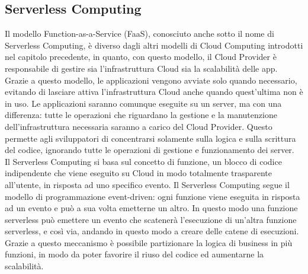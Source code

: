 \subsection{Serverless Computing} \label{serverless}
Il modello Function-as-a-Service (FaaS), conosciuto anche sotto il nome di Serverless Computing, è diverso dagli altri modelli di Cloud Computing introdotti nel capitolo precedente, in quanto, con questo modello, il Cloud Provider è responsabile di gestire sia l'infrastruttura Cloud sia la scalabilità delle app. Grazie a questo modello, le applicazioni vengono avviate solo quando necessario, evitando di lasciare attiva l'infrastruttura Cloud anche quando quest'ultima non è in uso. Le applicazioni saranno comunque eseguite su un server, ma con una differenza: tutte le operazioni che riguardano la gestione e la manutenzione dell'infrastruttura necessaria saranno a carico del Cloud Provider. Questo permette agli sviluppatori di concentrarsi solamente sulla logica e sulla scrittura del codice, ignorando tutte le operazioni di gestione e funzionamento dei server. \\
Il Serverless Computing si basa sul concetto di funzione, un blocco di codice indipendente che viene eseguito su Cloud in modo totalmente trasparente all'utente, in risposta ad uno specifico evento. Il Serverless Computing segue il modello di programmazione event-driven: ogni funzione viene eseguita in risposta ad un evento e può a sua volta emetterne un altro. In questo modo una funzione serverless può emettere un evento che scatenerà l'esecuzione di un'altra funzione serverless, e così via, andando in questo modo a creare delle catene di esecuzioni. Grazie a questo meccanismo è possibile partizionare la logica di business in più funzioni, in modo da poter favorire il riuso del codice ed aumentarne la scalabilità.

